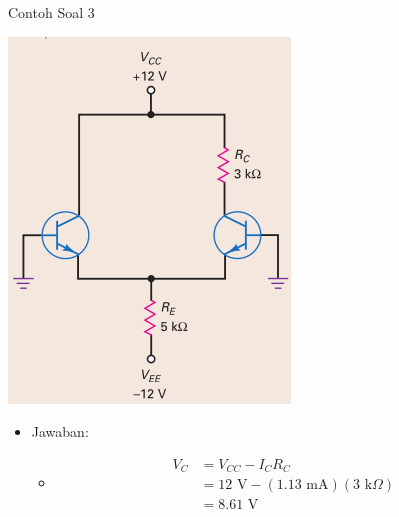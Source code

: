 \documentclass[aspectratio=169]{beamer}
\begin{document}
\begin{frame}{Contoh Soal 3}
	\begin{multicols}{2}
		\begin{center}
			\includegraphics[width=0.6\textheight]{gambar/01.latihan_soal_3}
		\end{center}
		\columnbreak
		\begin{itemize}
			\item Jawaban:
			\begin{itemize}
				\item[]
				\begin{align*}
					V_C &= V_{CC} - I_C R_C \\
					&= 12 \text{ V} - (1.13 \text{ mA})(3 \text{ k}\Omega) \\
					&= 8.61 \text{ V}
				\end{align*}
			\end{itemize}
		\end{itemize}
		\vfill\null
	\end{multicols}
\end{frame}
\end{document}
